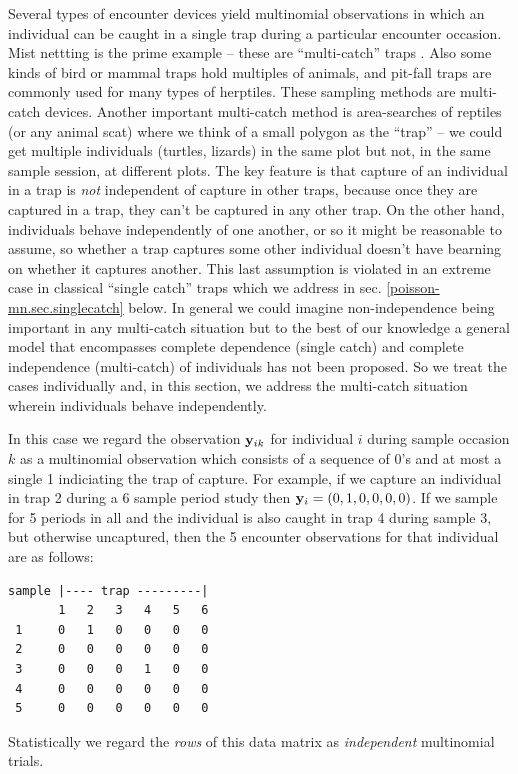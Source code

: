 Several types of encounter devices yield multinomial observations in
which an individual can be caught in a single trap during a particular
encounter occasion.  Mist nettting is the prime example -- these are
``multi-catch'' traps \citep{efford_etal:2009euring}. Also some kinds of
bird or mammal traps hold multiples of animals,
and pit-fall traps are commonly used for many types of
herptiles. These sampling methods are multi-catch devices. 
Another important multi-catch method is area-searches of reptiles (or
any animal scat) where we think of
a small polygon as the ``trap'' -- we could get multiple individuals
(turtles, lizards) in the same plot but not, in the same sample
session, at different plots.  The key feature is that capture of an
individual in a trap is {\it not} independent of capture in other
traps, because once they are captured in a trap,
they can't be captured in any other trap.
On the 
other hand, individuals behave independently of one another, or so it
might be reasonable to assume, so whether a trap captures some other
individual doesn't have bearning on whether it captures another.  This
last assumption is violated in an extreme case in classical ``single
catch'' traps which we address in sec. \ref{poisson-mn.sec.singlecatch}
below. In general we could imagine non-independence being important in
any multi-catch situation but to the best of our knowledge a general
model that encompasses complete dependence (single catch) and complete
independence (multi-catch) of individuals has not been proposed.  So
we treat the cases individually and, in this section, we address the
multi-catch situation wherein individuals behave independently.


In this case we regard the observation ${\bf y}_{ik}$ for
individual $i$ during sample occasion $k$ as a multinomial observation
which consists of a sequence of 0's and at most a single 1 indiciating
the trap of capture. For example, if we capture an individual in trap
2 during a 6 sample period study then ${\bf y}_{i} = (0,1,0,0,0,0)$.
If we sample for 5 periods in all and the individual is also caught
in trap 4 during sample 3, but otherwise uncaptured, then the 5 encounter observations for that
individual are as follows:
\begin{verbatim}
sample |---- trap ---------|
       1   2   3   4   5   6
 1     0   1   0   0   0   0
 2     0   0   0   0   0   0
 3     0   0   0   1   0   0
 4     0   0   0   0   0   0
 5     0   0   0   0   0   0
\end{verbatim}
Statistically we regard the {\it rows} of this data matrix as {\it
  independent} multinomial trials.

